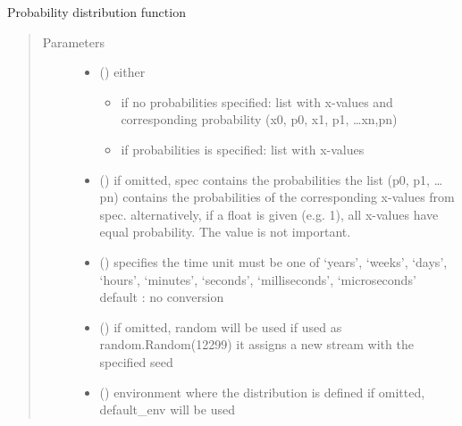 \documentclass[letterpaper,10pt,english]{sphinxmanual}
\begin{document}
\begin{fulllineitems}
\label{\detokenize{Reference:salabim.Pdf}}
Probability distribution function
\begin{quote}\begin{description}
\item[{Parameters}] \leavevmode\begin{itemize}
\item {} 
 () \textendash{} 
either
\begin{itemize}
\item {} 
if no probabilities specified: 
list with x-values and corresponding probability
(x0, p0, x1, p1, …xn,pn) 

\item {} 
if probabilities is specified: 
list with x-values

\end{itemize}


\item {} 
 (\sphinxstyleliteralemphasis{, }) \textendash{} if omitted, spec contains the probabilities 
the list (p0, p1, …pn) contains the probabilities of the corresponding
x-values from spec. 
alternatively, if a float is given (e.g. 1), all x-values
have equal probability. The value is not important.

\item {} 
 () \textendash{} specifies the time unit 
must be one of ‘years’, ‘weeks’, ‘days’, ‘hours’, ‘minutes’, ‘seconds’, ‘milliseconds’, ‘microseconds’ 
default : no conversion 

\item {} 
 () \textendash{} if omitted, random will be used 
if used as random.Random(12299)
it assigns a new stream with the specified seed

\item {} 
 ({\hyperref[\detokenize{Reference:salabim.Environment}]{}}) \textendash{} environment where the distribution is defined 
if omitted, default\_env will be used


\end{itemize}
\end{description}
\end{quote}
\end{fulllineitems}
\end{document}
